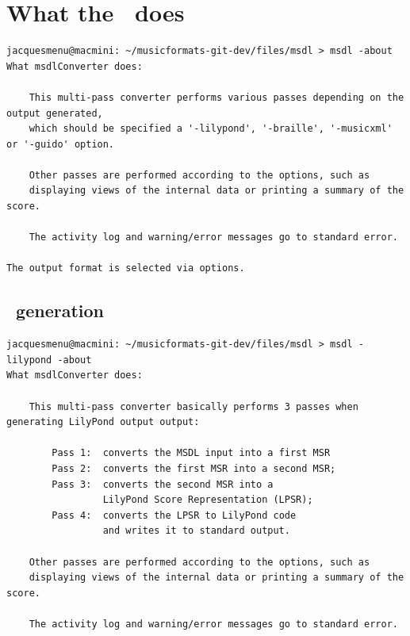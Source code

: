 \section{What the \msdLangComp\ does}

\begin{lstlisting}[language=Terminal]
jacquesmenu@macmini: ~/musicformats-git-dev/files/msdl > msdl -about
What msdlConverter does:

    This multi-pass converter performs various passes depending on the output generated,
    which should be specified a '-lilypond', '-braille', '-musicxml' or '-guido' option.

    Other passes are performed according to the options, such as
    displaying views of the internal data or printing a summary of the score.

    The activity log and warning/error messages go to standard error.

The output format is selected via options.
\end{lstlisting}

  \subsection{\lily\ generation}

\begin{lstlisting}[language=Terminal]
jacquesmenu@macmini: ~/musicformats-git-dev/files/msdl > msdl -lilypond -about
What msdlConverter does:

    This multi-pass converter basically performs 3 passes when generating LilyPond output output:

        Pass 1:  converts the MSDL input into a first MSR
        Pass 2:  converts the first MSR into a second MSR;
        Pass 3:  converts the second MSR into a
                 LilyPond Score Representation (LPSR);
        Pass 4:  converts the LPSR to LilyPond code
                 and writes it to standard output.

    Other passes are performed according to the options, such as
    displaying views of the internal data or printing a summary of the score.

    The activity log and warning/error messages go to standard error.
\end{lstlisting}

